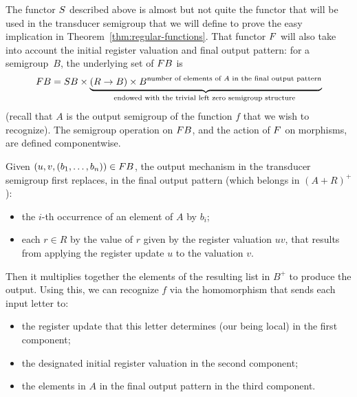 The functor $\functors$ described above is almost but not quite the functor that
will be used in the transducer semigroup that we will define to prove the easy
implication in Theorem~\ref{thm:regular-functions}. That functor $\functor$ will
also take into account the initial register valuation and final output pattern:
for a semigroup~$B$, the underlying set of $\functor B$ is
\[ \functor B =  \functors B \times \myunderbrace{(R \to B) \times
    B^{\text{number of elements of $A$ in the final output pattern}}}{endowed
    with the trivial left zero semigroup structure} \]
(recall that $A$ is the output semigroup of the function $f$ that we wish to
recognize). The semigroup operation on $\functor B$, and the action of
$\functor$ on morphisms, are defined componentwise.

Given $(u,v,(b_1,\dots,b_n)) \in \functor B$, the output mechanism in the
transducer semigroup first replaces, in the final output pattern (which belongs
in $(A+R)^+$):
\begin{itemize}
\item the $i$-th occurrence of an element of $A$ by $b_i$;
\item each $r \in R$ by the value of $r$ given by the register valuation $uv$,
  that results from applying the register update $u$ to the valuation $v$.
\end{itemize}
Then it multiplies together the elements of the resulting list in $B^+$ to
produce the output. Using this, we can recognize $f$ via the homomorphism that
sends each input letter to:
\begin{itemize}
\item the register update that this letter determines (our \sst being local) in
  the first component;
\item the designated initial register valuation in the second component;
\item the elements in $A$ in the final output pattern in the third component.
\end{itemize}
